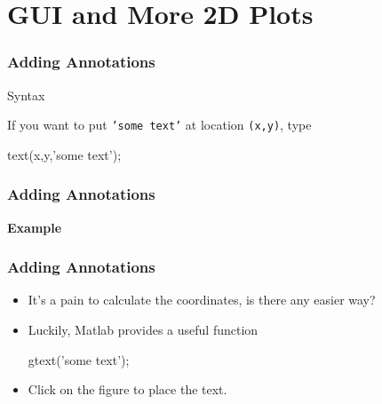\documentclass{beamer}  %
\begin{document}
\section{GUI and More 2D Plots}
\begin{frame}[fragile]
\frametitle{Adding Annotations}

\begin{block}{Syntax}

If you want to put \texttt{'some text'} at location \texttt{(x,y)}, type
\begin{matlabcodebeamer}[numbers=none,frame=none]
          text(x,y,'some text');
\end{matlabcodebeamer}
\end{block}

\end{frame}
\begin{frame}[fragile]
\frametitle{Adding Annotations}
\textbf{Example} 

\setcounter{subfigure}{0}
\begin{figure}
    \centering
\end{figure}

\end{frame}
\begin{frame}[fragile]
\frametitle{Adding Annotations}
\begin{itemize}[<+->]
    \item It's a pain to calculate the coordinates, is there any easier way?
    
    \item Luckily, Matlab provides a useful function
          \begin{matlabcode}[numbers=none,frame=none]
          gtext('some text');
          \end{matlabcode}

    \item Click on the figure to place the text.
\end{itemize}

\end{frame}
\end{document}
